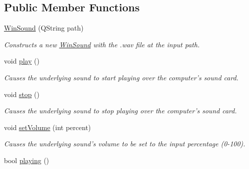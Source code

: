 \subsection*{Public Member Functions}
\begin{DoxyCompactItemize}
\item 
\hyperlink{class_picto_1_1_win_sound_abc181ccb88233d5914d4ef8fa03614f1}{Win\-Sound} (Q\-String path)
\begin{DoxyCompactList}\small\item\em Constructs a new \hyperlink{class_picto_1_1_win_sound}{Win\-Sound} with the .wav file at the input path. \end{DoxyCompactList}\item 
\hypertarget{class_picto_1_1_win_sound_a2911ad5d6ac3fe13553bd822dc5828a1}{void \hyperlink{class_picto_1_1_win_sound_a2911ad5d6ac3fe13553bd822dc5828a1}{play} ()}\label{class_picto_1_1_win_sound_a2911ad5d6ac3fe13553bd822dc5828a1}

\begin{DoxyCompactList}\small\item\em Causes the underlying sound to start playing over the computer's sound card. \end{DoxyCompactList}\item 
\hypertarget{class_picto_1_1_win_sound_a1f273752e3cf6bbea7c2f1cb9387eed7}{void \hyperlink{class_picto_1_1_win_sound_a1f273752e3cf6bbea7c2f1cb9387eed7}{stop} ()}\label{class_picto_1_1_win_sound_a1f273752e3cf6bbea7c2f1cb9387eed7}

\begin{DoxyCompactList}\small\item\em Causes the underlying sound to stop playing over the computer's sound card. \end{DoxyCompactList}\item 
void \hyperlink{class_picto_1_1_win_sound_aa8d01ac782a50c2109ce4f0b5125cd23}{set\-Volume} (int percent)
\begin{DoxyCompactList}\small\item\em Causes the underlying sound's volume to be set to the input percentage (0-\/100). \end{DoxyCompactList}\item 
\hypertarget{class_picto_1_1_win_sound_a22beef5e96cee1973aa4bbbea44e0565}{bool \hyperlink{class_picto_1_1_win_sound_a22beef5e96cee1973aa4bbbea44e0565}{playing} ()}\label{class_picto_1_1_win_sound_a22beef5e96cee1973aa4bbbea44e0565}


\end{DoxyCompactItemize}
